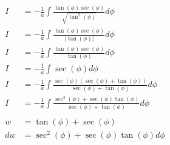 \documentclass[12pt]{article}
\begin{document}
\begin{align}
    I                                                      & = -\frac{1}{a} \int \frac{\tan(\phi)\sec(\phi)}{\sqrt{\tan^2(\phi)}} d\phi                                                                                    \\
    I                                                      & = -\frac{1}{a} \int \frac{\tan(\phi)\sec(\phi)}{|\tan(\phi)|} d\phi                                                                                           \\
    I                                                      & = -\frac{1}{a} \int \frac{\tan(\phi)\sec(\phi)}{\tan(\phi)} d\phi                                                                                             \\
    I                                                      & = -\frac{1}{a} \int \sec(\phi) d\phi                                                                                                                          \\
    I                                                      & = -\frac{1}{a} \int \frac{\sec(\phi)(\sec(\phi)+\tan(\phi))}{\sec(\phi)+\tan(\phi)} d\phi                                                                     \\
    I                                                      & = -\frac{1}{a} \int \frac{\sec^2(\phi) + \sec(\phi)\tan(\phi)}{\sec(\phi)+\tan(\phi)} d\phi                                                                   \\
    \nonumber                                                                                                                                                                                                              \\
    w                                                      & = \tan(\phi)+\sec(\phi)                                                                                                                                       \\
    dw                                                     & = \sec^2(\phi) + \sec(\phi)\tan(\phi) d\phi                                                                                                                   \\
    \nonumber                                                                                                                                                                                                              \\

\end{align}
\end{document}
